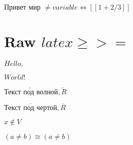 
\(\text{Привет }\allowbreak\text{мир }\allowbreak\neq variable \Leftrightarrow [[1 + 2 / 3]]\)

\section{Raw $latex \ge >=$}


\(Hello, \)\( World!\)

\(\widetilde {\text{Текст }\allowbreak\text{под }\allowbreak\text{волной}\allowbreak}, \widetilde R\)

\(\overline {\text{Текст }\allowbreak\text{под }\allowbreak\text{чертой}\allowbreak}, \overline R\)

\(x \not\in V\)

\((a \neq b) \cong (a \neq b)\)
